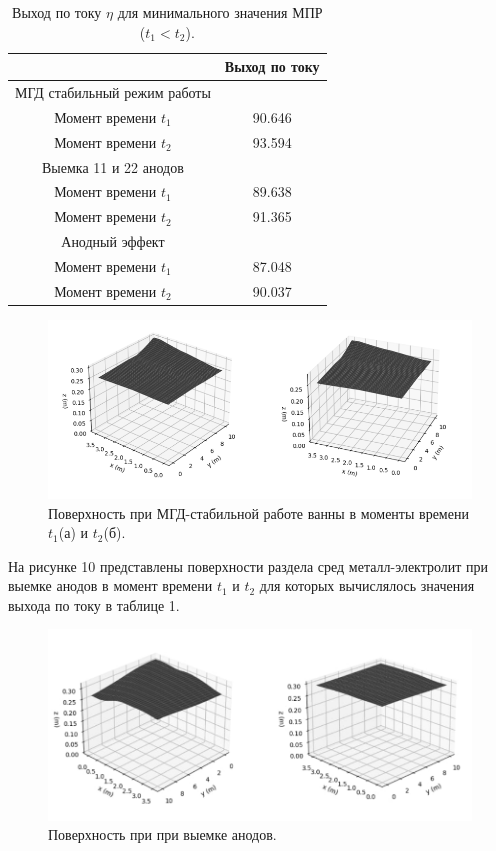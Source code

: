 \documentclass{article}
\begin{document}
\begin{table}[H]
\centering
\begin{tabular}{|c|c|}
\hline
			&Выход по току	\\
\hline
МГД стабильный режим работы &	\\
Момент времени $t_1$			&90.646	\\ 
Момент времени $t_2$		&93.594	\\  
\hline
Выемка 11 и 22 анодов &	\\
Момент времени $t_1$		&89.638	\\  
Момент времени $t_2$		&91.365	\\  
\hline
Анодный эффект &	\\
Момент времени $t_1$	&87.048	\\  
Момент времени $t_2$	&90.037	\\  
\hline
\end{tabular}
\caption{Выход по току $\eta$ для минимального значения МПР ($t_1 < t_2$). \label{table:vichPoToku}}
\end{table}

\begin{figure}[H]
    \centering
    \includegraphics[width=150mm]{спокойная поверхность.png}
    \caption{Поверхность при МГД-стабильной работе ванны в моменты времени $t_1$(а) и $t_2$(б).}
    \label{fig:} 
\end{figure}

На рисунке 10 представлены поверхности раздела сред металл-электролит при выемке анодов в момент времени $t_1$ и $t_2$ для которых вычислялось значения выхода по току в таблице 1.

\begin{figure}[H]
    \centering
    \includegraphics[width=150mm]{Выемка анодов поверхность.png}
    \caption{Поверхность при при выемке анодов.}
    \label{fig:} 
\end{figure}
\end{document}
